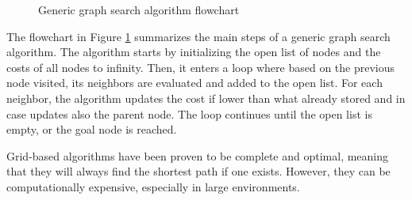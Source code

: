 \begin{figure}[H]
    \centering


    \caption{Generic graph search algorithm flowchart}
    \label{fig:graph_search_flowchart}

\end{figure}

The flowchart in Figure \ref{fig:graph_search_flowchart} summarizes the main steps of a generic graph search algorithm.
The algorithm starts by initializing the open list of nodes and the costs of all nodes to infinity.
Then, it enters a loop where based on the previous node visited, its neighbors are evaluated and added to the open list.
For each neighbor, the algorithm updates the cost if lower than what already stored and in case updates also the parent node.
The loop continues until the open list is empty, or the goal node is reached.

Grid-based algorithms have been proven to be complete and optimal, meaning that they will always find the shortest path if one exists.
However, they can be computationally expensive, especially in large environments.

